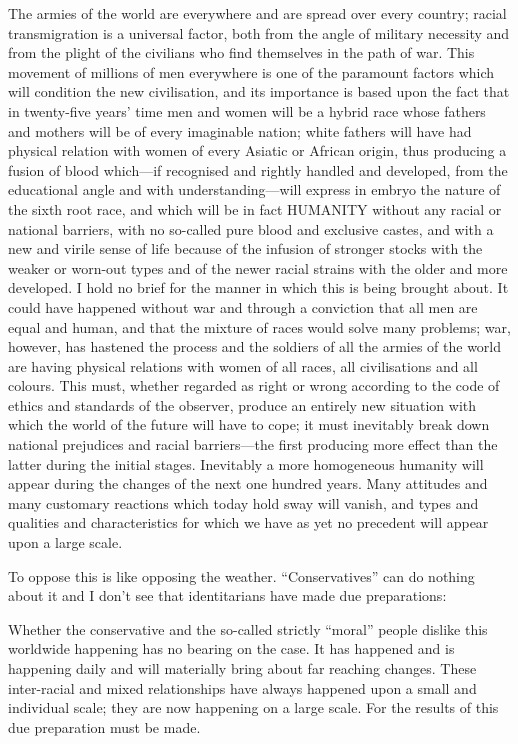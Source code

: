 \begin{quotex}
The armies of the world are everywhere and are spread over every country; racial transmigration is a universal factor, both from the angle of military necessity and from the plight of the civilians who find themselves in the path of war. This movement of millions of men everywhere is one of the paramount factors which will condition the new civilisation, and its importance is based upon the fact that in twenty-five years' time men and women will be a hybrid race whose fathers and mothers will be of every imaginable nation; white fathers will have had physical relation with women of every Asiatic or African origin, thus producing a fusion of blood which---if recognised and rightly handled and developed, from the educational angle and with understanding---will express in embryo the nature of the sixth root race, and which will be in fact HUMANITY without any racial or national barriers, with no so-called pure blood and exclusive castes, and with a new and virile sense of life because of the infusion of stronger stocks with the weaker or worn-out types and of the newer racial strains with the older and more developed. I hold no brief for the manner in which this is being brought about. It could have happened without war and through a conviction that all men are equal and human, and that the mixture of races would solve many problems; war, however, has hastened the process and the soldiers of all the armies of the world are having physical relations with women of all races, all civilisations and all colours. This must, whether regarded as right or wrong according to the code of ethics and standards of the observer, produce an entirely new situation with which the world of the future will have to cope; it must inevitably break down national prejudices and racial barriers---the first producing more effect than the latter during the initial stages. Inevitably a more homogeneous humanity will appear during the changes of the next one hundred years. Many attitudes and many customary reactions which today hold sway will vanish, and types and qualities and characteristics for which we have as yet no precedent will appear upon a large scale.
\end{quotex}


To oppose this is like opposing the weather. ``Conservatives'' can do nothing about it and I don't see that identitarians have made due preparations:

\begin{quotex}
Whether the conservative and the so-called strictly ``moral'' people dislike this worldwide happening has no bearing on the case. It has happened and is happening daily and will materially bring about far reaching changes. These inter-racial and mixed relationships have always happened upon a small and individual scale; they are now happening on a large scale. For the results of this due preparation must be made.
\end{quotex}




